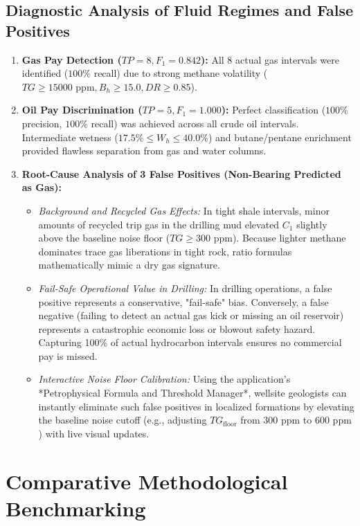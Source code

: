 \subsection{Diagnostic Analysis of Fluid Regimes and False Positives}
\begin{enumerate}
    \item \textbf{Gas Pay Detection ($TP = 8, F_1 = 0.842$):} All 8 actual gas intervals were identified ($100\%$ recall) due to strong methane volatility ($TG \ge 15000\text{ ppm}, B_h \ge 15.0, DR \ge 0.85$). 
    \item \textbf{Oil Pay Discrimination ($TP = 5, F_1 = 1.000$):} Perfect classification ($100\%$ precision, $100\%$ recall) was achieved across all crude oil intervals. Intermediate wetness ($17.5\% \le W_h \le 40.0\%$) and butane/pentane enrichment provided flawless separation from gas and water columns.
    \item \textbf{Root-Cause Analysis of 3 False Positives (Non-Bearing Predicted as Gas):}
    \begin{itemize}
        \item \textit{Background and Recycled Gas Effects:} In tight shale intervals, minor amounts of recycled trip gas in the drilling mud elevated $C_1$ slightly above the baseline noise floor ($TG \ge 300\text{ ppm}$). Because lighter methane dominates trace gas liberations in tight rock, ratio formulas mathematically mimic a dry gas signature.
        \item \textit{Fail-Safe Operational Value in Drilling:} In drilling operations, a false positive represents a conservative, "fail-safe" bias. Conversely, a false negative (failing to detect an actual gas kick or missing an oil reservoir) represents a catastrophic economic loss or blowout safety hazard. Capturing 100\% of actual hydrocarbon intervals ensures no commercial pay is missed.
        \item \textit{Interactive Noise Floor Calibration:} Using the application's *Petrophysical Formula and Threshold Manager*, wellsite geologists can instantly eliminate such false positives in localized formations by elevating the baseline noise cutoff (e.g., adjusting $TG_{\text{floor}}$ from $300\text{ ppm}$ to $600\text{ ppm}$) with live visual updates.
    \end{itemize}
\end{enumerate}

\section{Comparative Methodological Benchmarking}

